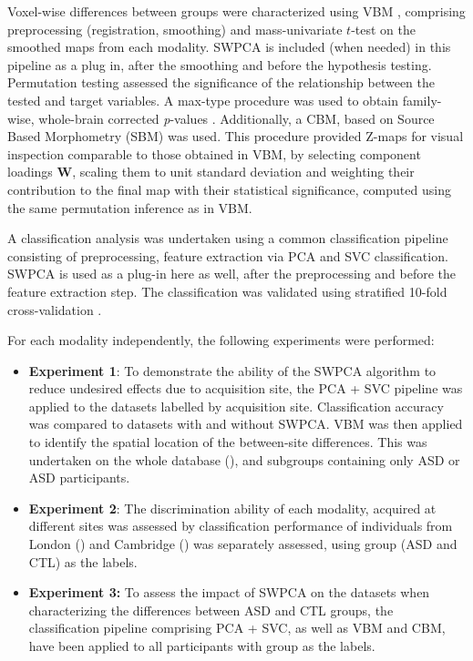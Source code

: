 Voxel-wise differences between groups were characterized using \ac{VBM} \cite{Ashburner2000}, comprising preprocessing (registration, smoothing) and mass-univariate $t$-test on the smoothed maps from each modality. \ac{SWPCA} is included (when needed) in this pipeline as a plug in, after the smoothing and before the hypothesis testing. Permutation testing assessed the significance of the relationship between the tested and target variables. A max-type procedure was used to obtain family-wise, whole-brain corrected \textit{p}{}-values \cite{Freedman1983}. Additionally, a \acf{CBM}, based on Source Based Morphometry (SBM) \cite{Xu2009} was used. This procedure provided Z-maps for visual inspection comparable to those obtained in \ac{VBM}, by selecting component loadings $\mathbf{W}$, scaling them to unit standard deviation and weighting their contribution to the final map with their statistical significance, computed using the same permutation inference as in \ac{VBM}. 

A classification analysis was undertaken using a common classification pipeline \cite{Khedher2015} consisting of preprocessing, feature extraction via \ac{PCA} and \ac{SVC} classification. \ac{SWPCA} is used as a plug-in here as well, after the preprocessing and before the feature extraction step. The classification was validated using stratified 10-fold cross-va\-li\-da\-tion \cite{Kohavi1995}. 

For each modality independently, the following experiments were performed: 
\begin{itemize}
	\item \textbf{Experiment 1}: To demonstrate the ability of the \ac{SWPCA} algorithm	to reduce undesired effects due to acquisition site, the \ac{PCA} + \ac{SVC} pipeline was applied to the datasets labelled by acquisition site. Classification accuracy was compared to datasets with and without \ac{SWPCA}. \ac{VBM} was then applied to identify the spatial location of the between-site differences. This was undertaken on the whole database (\all{}), and subgroups containing only \ac{ASD} or \ac{ASD} participants. 
	
	\item \textbf{Experiment 2}: The discrimination ability of each modality, acquired at different sites was assessed by classification performance of individuals from London (\lon{}) and Cambridge (\cam{}) was separately assessed, using group (\ac{ASD} and \ac{CTL}) as the labels. 
	
	\item \textbf{Experiment 3:} To assess the impact of \ac{SWPCA} on the datasets when characterizing the differences between \ac{ASD} and \ac{CTL} groups, the classification pipeline comprising \ac{PCA} + \ac{SVC}, as well as \ac{VBM} and \ac{CBM}, have been applied to all participants with group as the labels.
	
\end{itemize}

